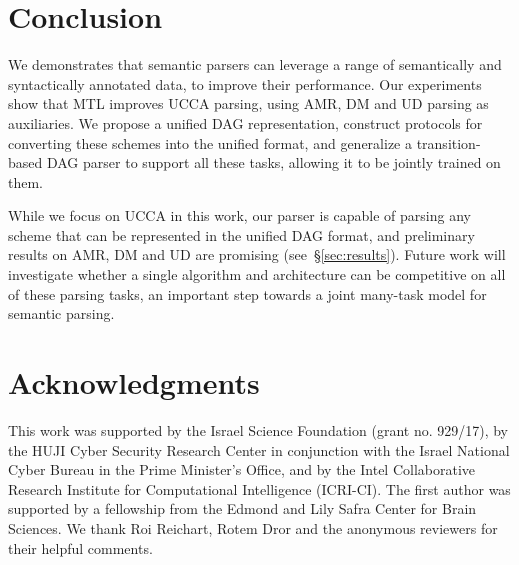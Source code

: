 \documentclass[11pt,a4paper]{article}
\begin{document}
\section{Conclusion}\label{sec:conclusion}

We demonstrates that semantic parsers can leverage a range of 
semantically and syntactically annotated data, to improve their performance.
Our experiments show that MTL improves UCCA parsing,
using AMR, DM and UD parsing as auxiliaries.
We propose a unified DAG representation, 
construct protocols for converting these schemes into the unified format,
and generalize a transition-based DAG parser to support all these tasks,
allowing it to be jointly trained on them.

While we focus on UCCA in this work, our parser is capable of parsing any
scheme that can be represented in the unified DAG format,
and preliminary results on AMR, DM and UD are promising (see~\S\ref{sec:results}).
Future work will investigate whether a single
algorithm and architecture can be competitive on all of these parsing tasks,
an important step towards a joint many-task model for semantic parsing.


\section*{Acknowledgments}

This work was supported by the Israel Science Foundation (grant no. 929/17),
by the HUJI Cyber Security Research Center
in conjunction with the Israel National Cyber Bureau in the Prime Minister's Office,
and by the Intel Collaborative Research Institute for Computational Intelligence (ICRI-CI).
The first author was supported by a fellowship from the
Edmond and Lily Safra Center for Brain Sciences.
We thank Roi Reichart, Rotem Dror
and the anonymous reviewers for their helpful comments.




\end{document}
